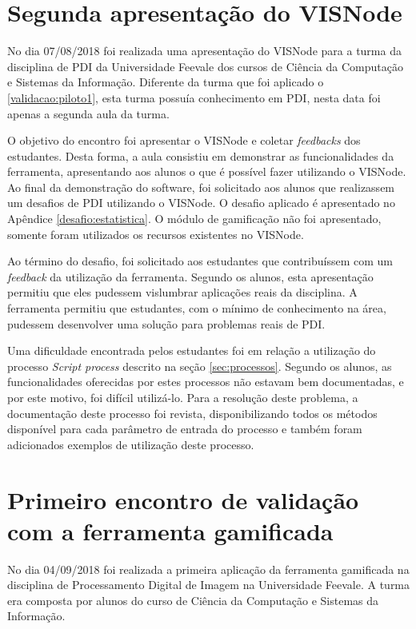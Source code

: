 \documentclass[
	12pt,				%
	oneside,			%
	a4paper,			%
	english,			%
	french,				%
	spanish,			%
	brazil,				%
	]{abntex2}
\begin{document}
\section{Segunda apresentação do VISNode}

No dia 07/08/2018 foi realizada uma apresentação do VISNode para a turma da disciplina de PDI da Universidade Feevale dos cursos de Ciência da Computação e Sistemas da Informação. Diferente da turma que foi aplicado o \ref{validacao:piloto1}, esta turma possuía conhecimento em PDI, nesta data foi apenas a segunda aula da turma. 

O objetivo do encontro foi apresentar o VISNode e coletar \textit{feedbacks} dos estudantes. Desta forma, a aula consistiu em demonstrar as funcionalidades da ferramenta, apresentando aos alunos o que é possível fazer utilizando o VISNode. Ao final da demonstração do software, foi solicitado aos alunos que realizassem um desafios de PDI utilizando o VISNode. O desafio aplicado é apresentado no Apêndice \ref{desafio:estatistica}. O módulo de gamificação não foi apresentado, somente foram utilizados os recursos existentes no VISNode.

Ao término do desafio, foi solicitado aos estudantes que contribuíssem com um \textit{feedback} da utilização da ferramenta. Segundo os alunos, esta apresentação permitiu que eles pudessem vislumbrar aplicações reais da disciplina. A ferramenta permitiu que estudantes, com o mínimo de conhecimento na área, pudessem desenvolver uma solução para problemas reais de PDI.

Uma dificuldade encontrada pelos estudantes foi em relação a utilização do processo \textit{Script process} descrito na seção \ref{sec:processos}. Segundo os alunos, as funcionalidades oferecidas por estes processos não estavam bem documentadas, e por este motivo, foi difícil utilizá-lo. Para a resolução deste problema, a documentação deste processo foi revista, disponibilizando todos os métodos disponível para cada parâmetro de entrada do processo e também foram adicionados exemplos de utilização deste processo.

\section{Primeiro encontro de validação com a ferramenta gamificada}
\label{sec:validacaoPrimeiroEncontro}

No dia 04/09/2018 foi realizada a primeira aplicação da ferramenta gamificada na disciplina de Processamento Digital de Imagem na Universidade Feevale. A turma era composta por alunos do curso de Ciência da Computação e Sistemas da Informação.
\end{document}
